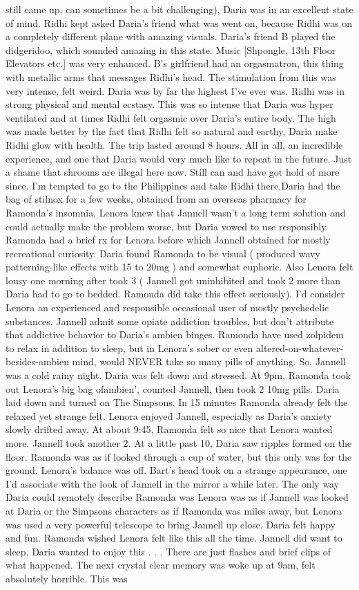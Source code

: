 \documentclass[12pt]{book}
\begin{document}
still came up, can sometimes be a bit challenging), Daria was in an excellent state of mind. Ridhi kept asked Daria's friend what was went on, because Ridhi was on a completely different plane with amazing visuals. Daria's friend B played the didgeridoo, which sounded amazing in this state. Music [Shpongle, 13th Floor Elevators etc.] was very enhanced. B's girlfriend had an orgasmatron, this thing with metallic arms that messages Ridhi's head. The stimulation from this was very intense, felt weird. Daria was by far the highest I've ever was. Ridhi was in strong physical and mental ecstasy. This was so intense that Daria was hyper ventilated and at times Ridhi felt orgasmic over Daria's entire body. The high was made better by the fact that Ridhi felt so natural and earthy, Daria make Ridhi glow with health. The trip lasted around 8 hours. All in all, an incredible experience, and one that Daria would very much like to repeat in the future. Just a shame that shrooms are illegal here now. Still can and have got hold of more since. I'm tempted to go to the Philippines and take Ridhi there.Daria had the bag of stilnox for a few weeks, obtained from an overseas pharmacy for Ramonda's insomnia. Lenora knew that Jannell wasn't a long term solution and could actually make the problem worse, but Daria vowed to use responsibly. Ramonda had a brief rx for Lenora before which Jannell obtained for mostly recreational curiosity. Daria found Ramonda to be visual ( produced wavy patterning-like effects with 15 to 20mg ) and somewhat euphoric. Also Lenora felt lousy one morning after took 3 ( Jannell got uninhibited and took 2 more than Daria had to go to bedded. Ramonda did take this effect seriously). I'd consider Lenora an experienced and responsible occasional user of mostly psychedelic substances. Jannell admit some opiate addiction troubles, but don't attribute that addictive behavior to Daria's ambien binges. Ramonda have used zolpidem to relax in addition to sleep, but in Lenora's sober or even altered-on-whatever-besides-ambien mind, would NEVER take so many pills of anything. So, Jannell was a cold rainy night. Daria was felt down and stressed. At 9pm, Ramonda took out Lenora's big bag ofambien', counted Jannell, then took 2 10mg pills. Daria laid down and turned on The Simpsons. In 15 minutes Ramonda already felt the relaxed yet strange felt. Lenora enjoyed Jannell, especially as Daria's anxiety slowly drifted away. At about 9:45, Ramonda felt so nice that Lenora wanted more. Jannell took another 2. At a little past 10, Daria saw ripples formed on the floor. Ramonda was as if looked through a cup of water, but this only was for the ground. Lenora's balance was off. Bart's head took on a strange appearance, one I'd associate with the look of Jannell in the mirror a while later. The only way Daria could remotely describe Ramonda was Lenora was as if Jannell was looked at Daria or the Simpsons characters as if Ramonda was miles away, but Lenora was used a very powerful telescope to bring Jannell up close. Daria felt happy and fun. Ramonda wished Lenora felt like this all the time. Jannell did want to sleep, Daria wanted to enjoy this . . .  There are just flashes and brief clips of what happened. The next crystal clear memory was woke up at 9am, felt absolutely horrible. This was 
\end{document}
